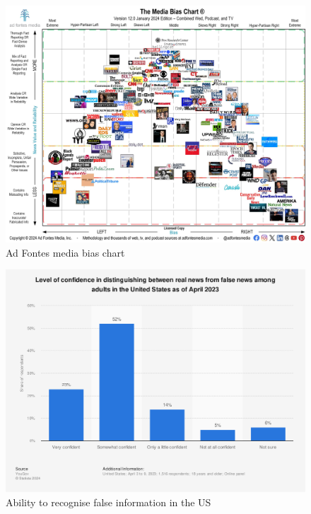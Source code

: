 \begin{figure}[htbp]
    \centering
    \includegraphics[width=0.8\linewidth]{images/Media-Bias-Chart-12.0_Jan-2024-Licensed-scaled.jpg}
    \caption{Ad Fontes media bias chart}
    \label{fig:adfontes-media-bias-chart}
\end{figure}

\begin{figure}[htbp]
    \centering
    \includegraphics[width=0.9\linewidth]{images/statistic_id657090_ability-to-recognize-false-information-and-news-in-the-us-2023.png}
    \caption{Ability to recognise false information in the US \cite{yougov-2023-confidence}}
    \label{fig:ability-to-recognize-false-information-and-news-in-the-us-2023}
\end{figure}

